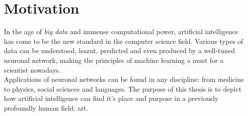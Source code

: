 \chapter*{Motivation}

In the age of \textit{big data} and immense computational power, artificial intelligence has come to be the new standard in the computer science field. Various types of data can be understood, learnt, predicted and even produced by a well-tuned neuronal network, making the principles of machine learning a must for a scientist nowadays.\\


Applications of neuronal networks can be found in any discipline: from medicine to physics, social sciences and languages. The purpose of this thesis is to depict how artificial intelligence can find it's place and purpose in a previously profoundly human field: art.
